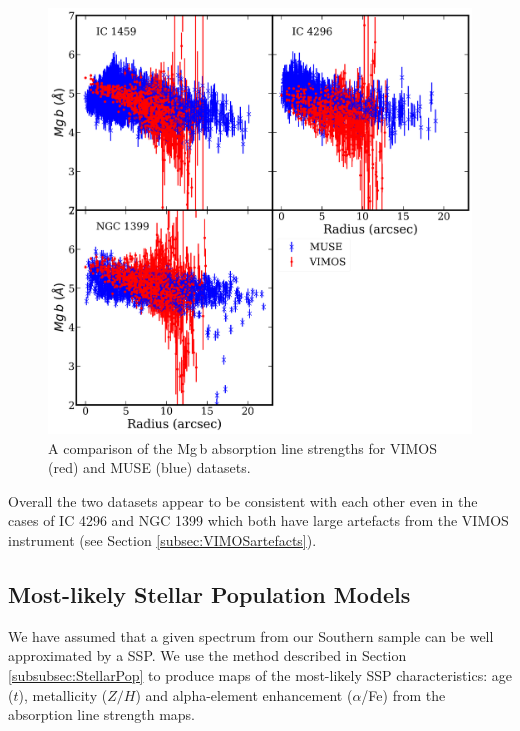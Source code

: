 			\begin{figure}
				\centering
				\includegraphics[width=.9\textwidth]{chapter4/compare_Mgb.png}
				\caption[Comparison between Mg\,b radial profiles from VIMOS and MUSE datacubes]{A comparison of the Mg\,b absorption line strengths for VIMOS (red) and MUSE (blue) datasets.}
				\label{fig:compare_mgbprofile}
			\end{figure}

			Overall the two datasets appear to be consistent with each other even in the cases of IC 4296 and NGC 1399 which both have large artefacts from the VIMOS instrument (see Section \ref{subsec:VIMOSartefacts}). 


	\subsection{Most-likely Stellar Population Models}
		\label{subsec:ssp}
		We have assumed that a given spectrum from our Southern sample can be well approximated by a SSP. We use the method described in Section \ref{subsubsec:StellarPop} to produce maps of the most-likely SSP characteristics: age ($t$), metallicity ($Z/H$) and alpha-element enhancement ($\alpha$/Fe) from the absorption line strength maps. 

